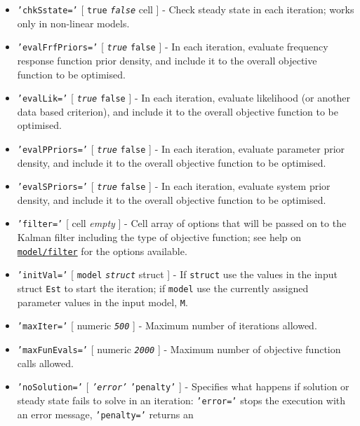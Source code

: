 \begin{itemize}
\item
  \texttt{'chkSstate='} {[} \texttt{true} \textbar{}
  \emph{\texttt{false}} \textbar{} cell {]} - Check steady state in each
  iteration; works only in non-linear models.
\item
  \texttt{'evalFrfPriors='} {[} \emph{\texttt{true}} \textbar{}
  \texttt{false} {]} - In each iteration, evaluate frequency response
  function prior density, and include it to the overall objective
  function to be optimised.
\item
  \texttt{'evalLik='} {[} \emph{\texttt{true}} \textbar{} \texttt{false}
  {]} - In each iteration, evaluate likelihood (or another data based
  criterion), and include it to the overall objective function to be
  optimised.
\item
  \texttt{'evalPPriors='} {[} \emph{\texttt{true}} \textbar{}
  \texttt{false} {]} - In each iteration, evaluate parameter prior
  density, and include it to the overall objective function to be
  optimised.
\item
  \texttt{'evalSPriors='} {[} \emph{\texttt{true}} \textbar{}
  \texttt{false} {]} - In each iteration, evaluate system prior density,
  and include it to the overall objective function to be optimised.
\item
  \texttt{'filter='} {[} cell \textbar{} \emph{empty} {]} - Cell array
  of options that will be passed on to the Kalman filter including the
  type of objective function; see help on
  \href{model/filter}{\texttt{model/filter}} for the options available.
\item
  \texttt{'initVal='} {[} \texttt{model} \textbar{}
  \emph{\texttt{struct}} \textbar{} struct {]} - If \texttt{struct} use
  the values in the input struct \texttt{Est} to start the iteration; if
  \texttt{model} use the currently assigned parameter values in the
  input model, \texttt{M}.
\item
  \texttt{'maxIter='} {[} numeric \textbar{} \emph{\texttt{500}} {]} -
  Maximum number of iterations allowed.
\item
  \texttt{'maxFunEvals='} {[} numeric \textbar{} \emph{\texttt{2000}}
  {]} - Maximum number of objective function calls allowed.
\item
  \texttt{'noSolution='} {[} \emph{\texttt{'error'}} \textbar{}
  \texttt{'penalty'} {]} - Specifies what happens if solution or steady
  state fails to solve in an iteration: \texttt{'error='} stops the
  execution with an error message, \texttt{'penalty='} returns an

\end{itemize}
